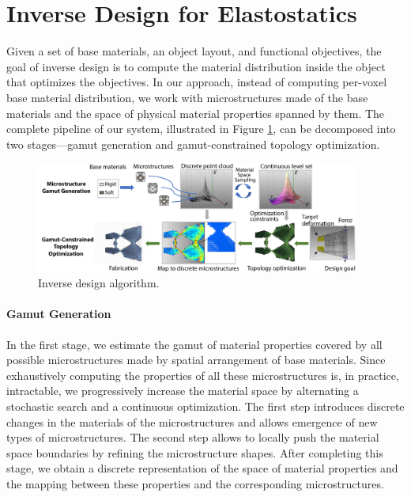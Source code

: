 \section{Inverse Design for Elastostatics}
Given a set of base materials, an object layout, and functional objectives, the goal of inverse design is to compute the material distribution inside the object that optimizes the objectives.
In our approach, instead of computing per-voxel base material distribution, we work with microstructures made of the base materials and the space of physical material properties spanned by them. The complete pipeline of our system, illustrated in Figure \ref{fig:topoptOverview}, can be decomposed into two stages---gamut generation and gamut-constrained topology optimization.
\begin{figure}[hb]
	\centering
	\includegraphics[width=0.95\textwidth]{images/topoptOverview.pdf}
	\caption{Inverse design algorithm.}
	\label{fig:topoptOverview}
\end{figure}
\paragraph{Gamut Generation}
In the first stage, we estimate the gamut of material properties covered by all possible microstructures made by spatial arrangement of base materials. 
Since exhaustively computing the properties of all these microstructures is, in practice, intractable, we progressively increase the material space by alternating a stochastic search and a continuous optimization. The first step introduces discrete changes in the materials of the microstructures and allows emergence of new types of microstructures. The second step allows to locally push the material space boundaries by refining the microstructure shapes. After completing this stage, we obtain a discrete representation of the space of material properties and the mapping between these properties and the corresponding microstructures.

